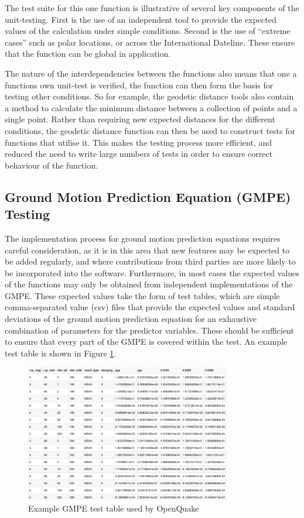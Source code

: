 The test suite for this one function is illustrative of several key components of the unit-testing. First is the use of an independent tool to provide the expected values of the calculation under simple conditions. Second is the use of ``extreme cases'' such as polar locations, or across the International Dateline. These ensure that the function can be global in application. 

The nature of the interdependencies between the functions also means that one a functions own unit-test is verified, the function can then form the basis for testing other conditions. So for example, the geodetic distance tools also contain a method to calculate the minimum distance between a collection of points and a single point. Rather than requiring new expected distances for the different conditions, the geodetic distance function can then be used to construct tests for functions that utilise it. This makes the testing process more efficient, and reduced the need to write large numbers of tests in order to ensure correct behaviour of the function.

\subsection{Ground Motion Prediction Equation (GMPE) Testing}

The implementation process for ground motion prediction equations requires careful consideration, as it is in this area that new features may be expected to be added regularly, and where contributions from third parties are more likely to be incorporated into the software. Furthermore, in most cases the expected values of the functions may only be obtained from independent implementations of the GMPE. These expected values take the form of test tables, which are simple comma-separated value (csv) files that provide the expected values and standard deviations of the ground motion prediction equation for an exhaustive combination of parameters for the predictor variables. These should be sufficient to ensure that every part of the GMPE is covered within the test. An example test table is shown in Figure \ref{fig:gmpe_test_table}.

\begin{figure}[htbp]
  \centering
  \includegraphics[width=0.8\textwidth]{./qareport/pictures/test_tables_screen_capture.pdf}
  \caption{Example GMPE test table used by OpenQuake}
  \label{fig:gmpe_test_table}
\end{figure}

